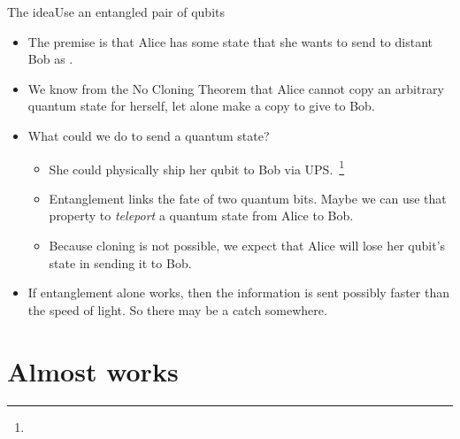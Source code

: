 \begin{frame}{The idea}{Use an entangled pair of qubits}

\begin{itemize}[<+->]
    \item The premise is that Alice has some state  that she wants to send to distant Bob as .
    \item We know from the No Cloning Theorem that Alice cannot copy an arbitrary quantum state for herself, let alone make a copy to give to Bob.
    \item What could we do to send a quantum state?
    \begin{itemize}
    \item She could physically ship her qubit to Bob via UPS.~\footnote{}
    \item Entanglement links the fate of two quantum bits.  Maybe we can use that property to \emph{teleport} a quantum state from Alice to Bob.
    \item Because cloning is not possible, we expect that Alice will lose her qubit's state in sending it to Bob.
    \end{itemize}
    \item If entanglement alone works, then the information is sent possibly faster than the speed of light.  So there may be a catch somewhere.
\end{itemize}

\end{frame}

\section*{Almost works}


